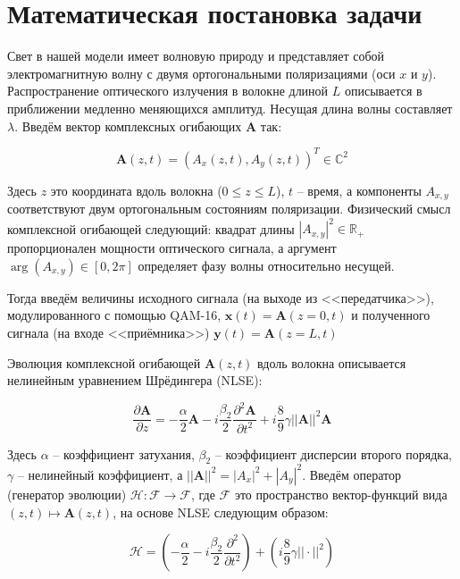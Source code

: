 \section{Математическая постановка задачи}

Свет в нашей модели имеет волновую природу и представляет собой электромагнитную волну с двумя ортогональными поляризациями (оси $x$ и $y$). Распространение оптического излучения в волокне длиной $L$ описывается в приближении медленно меняющихся амплитуд. Несущая длина волны составляет $\lambda$. Введём вектор комплексных огибающих $\mathbf{A}$ так:

\begin{equation}
	\mathbf{A}(z, t) = \left( A_x(z, t), A_y(z, t) \right)^T \in \mathbb{C}^2
\end{equation}

Здесь $z$ это координата вдоль волокна ($0 \leq z \leq L$), $t$ -- время, а компоненты $A_{x,y}$ соответствуют двум ортогональным состояниям поляризации. Физический смысл комплексной огибающей следующий: квадрат длины $|A_{x, y}|^2 \in \mathbb{R}_+$ пропорционален мощности оптического сигнала, а аргумент $\arg(A_{x,y}) \in [0, 2\pi]$ определяет фазу волны относительно несущей.

Тогда введём величины исходного сигнала (на выходе из <<передатчика>>), модулированного с помощью QAM-16, $\mathbf{x}(t) = \mathbf{A}(z=0, t)$ и полученного сигнала (на входе <<приёмника>>) $\mathbf{y}(t) = \mathbf{A}(z=L, t)$

Эволюция комплексной огибающей $\mathbf{A}(z, t)$ вдоль волокна описывается нелинейным уравнением Шрёдингера (NLSE):

\begin{equation}
	\frac{\partial \mathbf{A}}{\partial z} = - \frac{\alpha}{2} \mathbf{A} - i \frac{\beta_2}{2} \frac{\partial^2 \mathbf{A}}{\partial t^2} + i \frac{8}{9} \gamma ||\mathbf{A}||^2 \mathbf{A}
\end{equation}

Здесь $\alpha$ -- коэффициент затухания, $\beta_2$ -- коэффициент дисперсии второго порядка, $\gamma$ -- нелинейный коэффициент, а $||\mathbf{A}||^2 = |A_x|^2 + |A_y|^2$. Введём оператор (генератор эволюции) $\mathcal{H}: \mathcal{F} \to \mathcal{F}$, где $\mathcal{F}$ это пространство вектор-функций вида $(z, t) \mapsto \mathbf{A}(z, t)$, на основе NLSE следующим образом:

\begin{equation}
	\mathcal{H} = \left( - \frac{\alpha}{2} - i \frac{\beta_2}{2} \frac{\partial^2}{\partial t^2} \right) + \left( i \frac{8}{9} \gamma ||\cdot||^2 \right)
\end{equation}

